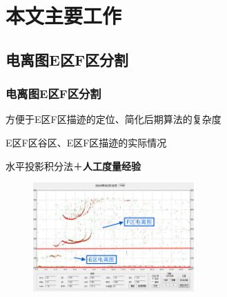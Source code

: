 \documentclass[notheorems,mathserif,table,compress]{beamer}  %
\begin{document}
\section{本文主要工作}
\subsection{电离图E区F区分割}
\begin{frame}
 \frametitle{电离图E区F区分割 }
\begin{tcolorbox}[colback=blue!5,colframe=blue!75!black]
\begin{description}
\vspace{-0.5em}
\addtolength{\itemindent}{-4em}
\item[目的] 方便于E区F区描迹的定位、简化后期算法的复杂度
\item[依据] E区F区谷区、E区F区描迹的实际情况
\item[算法] 水平投影积分法＋\color{blue}\textbf{人工度量经验}
\vspace{-1em}
\end{description}
\end{tcolorbox}
\begin{figure}[!htb] %
\centering
\includegraphics[width=0.55\textwidth]{分割图例.png}
\label{fig:2}
\end{figure}
\end{frame}
\end{document}
